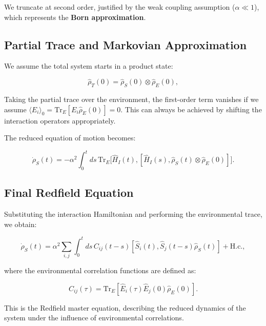 We truncate at second order, justified by the weak coupling assumption ($\alpha \ll 1$), which represents the \textbf{Born approximation}.

\subsection{Partial Trace and Markovian Approximation}

We assume the total system starts in a product state:

\begin{equation}
	\hat{\rho}_T(0) = \hat{\rho}_S(0) \otimes \hat{\rho}_E(0),
	\label{eq:Initial_Product_State}
\end{equation}

Taking the partial trace over the environment, the first-order term vanishes if we assume $\langle E_i \rangle_0 = \mathrm{Tr}_E[E_i \hat{\rho}_E(0)] = 0$. This can always be achieved by shifting the interaction operators appropriately.

The reduced equation of motion becomes:

\begin{equation}
	\dot{\rho}_S(t) = - \alpha^2 \int_0^t ds \, \mathrm{Tr}_E \big[\hat{H}_I(t), [\hat{H}_I(s), \hat{\rho}_S(t) \otimes \hat{\rho}_E(0)]\big].
	\label{eq:Partial_Trace_Derivation}
\end{equation}

\subsection{Final Redfield Equation}

Substituting the interaction Hamiltonian and performing the environmental trace, we obtain:

\begin{equation}
	\dot{\rho}_S(t) = \alpha^2 \sum_{i,j} \int_0^t ds \, C_{ij}(t-s) \left[ \hat{S}_i(t), \hat{S}_j(t-s) \hat{\rho}_S(t) \right] + \text{H.c.},
	\label{eq:Redfield_Equation_Final}
\end{equation}

where the environmental correlation functions are defined as:

\begin{equation}
	C_{ij}(\tau) = \mathrm{Tr}_E[\hat{E}_i(\tau) \hat{E}_j(0) \hat{\rho}_E(0)].
	\label{eq:Environment_Correlation_Function}
\end{equation}

This is the Redfield master equation, describing the reduced dynamics of the system under the influence of environmental correlations.

